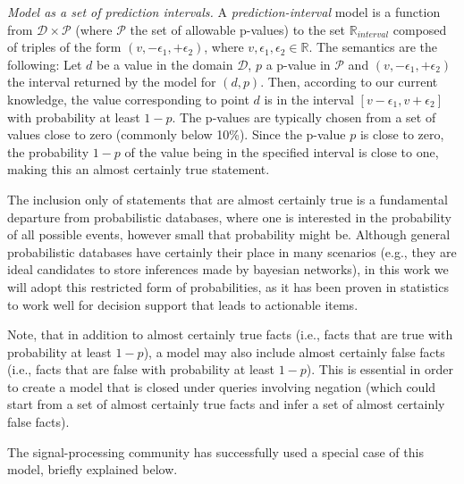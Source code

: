 \noindent \emph{Model as a set of prediction intervals.} A \emph{prediction-interval} model is a function from $\mathcal{D} \times \mathcal{P}$ (where $\mathcal{P}$ the set of allowable p-values) to the set $\mathbb{R}_{interval}$ composed of triples of the form $(v, -\epsilon_1, +\epsilon_2)$, where $v, \epsilon_1, \epsilon_2 \in \mathbb{R}$. The semantics are the following: Let $d$ be a value in the domain $\mathcal{D}$, $p$ a p-value in $\mathcal{P}$ and $(v, -\epsilon_1, +\epsilon_2)$ the interval returned by the model for $(d, p)$. Then, according to our current knowledge, the value corresponding to point $d$ is in the interval $[v -\epsilon_1, v + \epsilon_2]$ with probability at least $1-p$. The p-values are typically chosen from a set of values close to zero (commonly below 10\%). Since the p-value $p$ is close to zero, the probability $1-p$ of the value being in the specified interval is close to one, making this an almost certainly true statement.

The inclusion only of statements that are almost certainly true is a fundamental departure from probabilistic databases, where one is interested in the probability of all possible events, however small that probability might be. Although general probabilistic databases have certainly their place in many scenarios (e.g., they are ideal candidates to store inferences made by bayesian networks), in this work we will adopt this restricted form of probabilities, as it has been proven in statistics to work well for decision support that leads to actionable items.

Note, that in addition to almost certainly true facts (i.e., facts that are true with probability at least $1-p$), a model may also include almost certainly false facts (i.e., facts that are false with probability at least $1-p$). This is essential in order to create a model that is closed under queries involving negation (which could start from a set of almost certainly true facts and infer a set of almost certainly false facts).

The signal-processing community has successfully used a special case of this model, briefly explained below.\\ 

